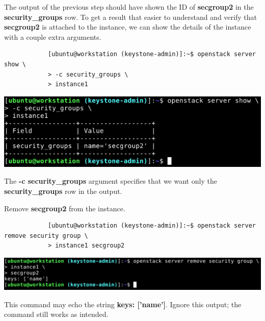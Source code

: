 \documentclass[letterpaper, 12pt]{article}
\begin{document}
\begin{enumerate}
    \begin{labstep}
        The output of the previous step should have shown the ID of \textbf{secgroup2} in the \textbf{security\_groups} row.
        To get a result that easier to understand and verify that \textbf{secgroup2} is attached to the instance, we can show the details of the instance with a couple extra arguments.
        \begin{lstlisting}
            [ubuntu@workstation (keystone-admin)]:~$ openstack server show \
            > -c security_groups \
            > instance1
        \end{lstlisting}

        \begin{center}
            \includegraphics[width=\linewidth]{images/part2/step3.png}
        \end{center}
    \end{labstep}

    \begin{tipbox}
        The \textbf{-c security\_groups} argument specifies that we want only the \textbf{security\_groups} row in the output.
    \end{tipbox}

    \begin{labstep}
        Remove \textbf{secgroup2} from the instance.
        \begin{lstlisting}
            [ubuntu@workstation (keystone-admin)]:~$ openstack server remove security group \
            > instance1 secgroup2
        \end{lstlisting}

        \begin{center}
            \includegraphics[width=\linewidth]{images/part2/step4.png}
        \end{center}
    \end{labstep}

    \begin{notebox}
        This command may echo the string \textbf{keys: ['name']}.
        Ignore this output; the command still works as intended.
    \end{notebox}


\end{enumerate}
\end{document}
